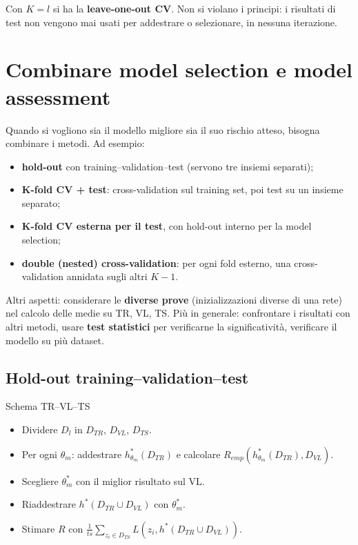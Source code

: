 Con \(K = l\) si ha la \textbf{leave-one-out CV}. Non si violano i
principi: i risultati di test non vengono mai usati per addestrare o
selezionare, in nessuna iterazione.

\section{Combinare model selection e model
assessment}\label{combinare-model-selection-e-model-assessment}

Quando si vogliono sia il modello migliore sia il suo rischio atteso,
bisogna combinare i metodi. Ad esempio:

\begin{itemize}
\tightlist
\item
  \textbf{hold-out} con training--validation--test (servono tre insiemi
  separati);
\item
  \textbf{K-fold CV + test}: cross-validation sul training set, poi test
  su un insieme separato;
\item
  \textbf{K-fold CV esterna per il test}, con hold-out interno per la
  model selection;
\item
  \textbf{double (nested) cross-validation}: per ogni fold esterno, una
  cross-validation annidata sugli altri \(K-1\).
\end{itemize}

Altri aspetti: considerare le \textbf{diverse prove} (inizializzazioni
diverse di una rete) nel calcolo delle medie su TR, VL, TS. Più in
generale: confrontare i risultati con altri metodi, usare \textbf{test
statistici} per verificarne la significatività, verificare il modello su
più dataset.

\subsection{Hold-out
training--validation--test}\label{hold-out-trainingvalidationtest}

\begin{boxabstract}{Schema TR--VL--TS}

\begin{itemize}
\tightlist
\item
  Dividere \(D_l\) in \(D_{TR}\), \(D_{VL}\), \(D_{TS}\).
\item
  Per ogni \(\theta_m\): addestrare \(h^*_{\theta_m}(D_{TR})\) e
  calcolare \(R_{emp}(h^*_{\theta_m}(D_{TR}), D_{VL})\).
\item
  Scegliere \(\theta^*_m\) con il miglior risultato sul VL.
\item
  Riaddestrare \(h^*(D_{TR} \cup D_{VL})\) con \(\theta^*_m\).
\item
  Stimare \(R\) con
  \(\frac{1}{ts}\sum_{z_i \in D_{TS}} L(z_i, h^*(D_{TR} \cup D_{VL}))\).
\end{itemize}

\end{boxabstract}


